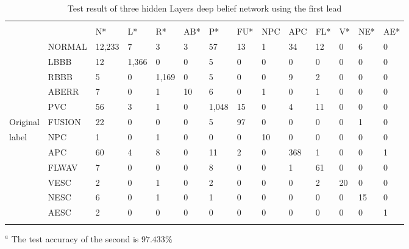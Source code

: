 \documentclass[graybox]{svmult}
\begin{document}
\begin{table}
\caption{Test result of three hidden Layers deep belief network using the first lead}
\label{tab:8}  
\begin{tabular}{p{1cm}p{1.2cm}p{0.9cm}p{0.7cm}p{0.7cm}p{0.6cm}p{0.6cm}p{0.6cm}p{0.7cm}p{0.6cm}p{0.6cm}p{0.6cm}p{0.7cm}p{0.7cm}}
\hline\noalign{\smallskip}
\multicolumn{9}{r}{Algorithm classified label} \\
\noalign{\smallskip}\hline\noalign{\smallskip}
		 &      & N* & L* & R* & AB* & P* & FU* & NPC & APC & FL* & V* & NE*& AE*\\
\noalign{\smallskip}\svhline\noalign{\smallskip}
		 & NORMAL & 12,233& 7   &  3   &  3   &  57  &  13   &	1   &  34 &   12  &   0  &  6  &  0 \\
	     & LBBB   &  12   & 1,366&  0  &  0   &  5   &  0    &  0   &  0  &   0   &   0  &  0  &  0 \\
		 & RBBB   &  5    &  0  & 1,169&  0   &  5   &  0    &	0   &  9  &   2   &   0  &  0  &  0 \\
		 & ABERR  &  7    &  0  &  1   &  10  &  6   &  0    &	1   &  0  &   1   &   0  &  0  &  0 \\
		 & PVC    &  56   &  3  &  1   &  0   & 1,048&  15   &	0   &  4  &   11  &   0  &  0  &  0 \\
Original & FUSION &	 22   &  0  &  0   &  0   &  5   &   97  &	0   &  0  &   0   &   0  &  1  &  0 \\
label    & NPC    &	 1    &  0  &  1   &  0   &  0   &  0    &	10  &  0  &   0   &   0  &  0  &  0 \\
		 & APC    &	 60   &  4  &  8   &  0   &  11  &  2    &	0   &  368&   1   &   0  &  0  &  1 \\
		 & FLWAV  &	 7    &  0  &  0   &  0   &  8   &  0    &	0   &  1  &   61  &   0  &  0  &  0 \\
		 & VESC   &	 2    &  0  &  1   &  0   &  2   &  0    &	0   &  0  &   2   &  20  &  0  &  0 \\
		 & NESC   &	 6    &  0  &  1   &  0   &  1   &  0    &	0   &  0  &   0   &   0  &  15 &  0 \\
		 & AESC   &	 2    &  0  &  0   &  0   &  0   &  0    &	0   &  0  &   0   &   0  &  0  &  1 \\
\noalign{\smallskip}\hline\noalign{\smallskip}
\end{tabular}
$^a$ The test accuracy of the second is $97.433\%$
\end{table}
\end{document}

